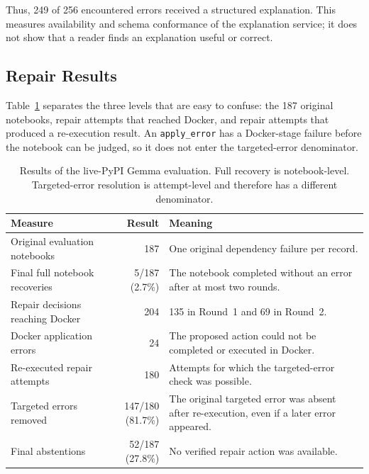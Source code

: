 Thus, 249 of 256 encountered errors received a structured explanation. This
measures availability and schema conformance of the explanation service; it
does not show that a reader finds an explanation useful or correct.

\subsection{Repair Results}
\label{sec:v-final-primary}

Table~\ref{tab:v-final-results-current} separates the three levels that are
easy to confuse: the 187 original notebooks, repair attempts that reached
Docker, and repair attempts that produced a re-execution result. An
\texttt{apply\_error} has a Docker-stage failure before the notebook can be
judged, so it does not enter the targeted-error denominator.

\begin{table}[htbp]
  \centering
  \small
  \setlength{\tabcolsep}{3pt}
  \begin{tabular}{|p{7.2cm}|r|p{3.8cm}|}
    \hline
    \textbf{Measure} & \textbf{Result} & \textbf{Meaning} \\
    \hline
    Original evaluation notebooks & 187 & One original dependency failure per record. \\
    \hline
    Final full notebook recoveries & 5/187 (2.7\%) & The notebook completed without an error after at most two rounds. \\
    \hline
    Repair decisions reaching Docker & 204 & 135 in Round~1 and 69 in Round~2. \\
    \hline
    Docker application errors & 24 & The proposed action could not be completed or executed in Docker. \\
    \hline
    Re-executed repair attempts & 180 & Attempts for which the targeted-error check was possible. \\
    \hline
    Targeted errors removed & 147/180 (81.7\%) & The original targeted error was absent after re-execution, even if a later error appeared. \\
    \hline
    Final abstentions & 52/187 (27.8\%) & No verified repair action was available. \\
    \hline
  \end{tabular}
  \caption{Results of the live-PyPI Gemma evaluation. Full recovery is
  notebook-level. Targeted-error resolution is attempt-level and therefore has
  a different denominator.}
  \label{tab:v-final-results-current}
\end{table}


